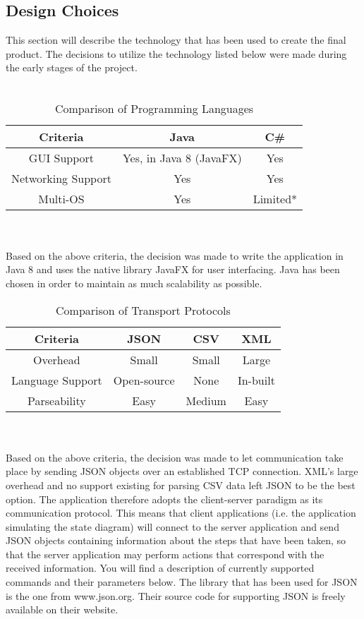 \documentclass[11pt,a4paper,twocolumn]{article}
\begin{document}
\subsection{Design Choices}
This section will describe the technology that has been used to create the final product. The decisions to utilize the technology listed below were made during the early stages of the project.\\\\
\begin{table}[h]
	\begin{center}
		\begin{tabular}{| c || c | c |}
			\hline
			Criteria & Java & C\# \\ \hline
			GUI Support & Yes, in Java 8 (JavaFX) & Yes \\ \hline
			Networking Support & Yes & Yes \\ \hline
			Multi-OS & Yes & Limited* \\ \hline
		\end{tabular}
		\caption{Comparison of Programming Languages}
	\end{center}
\end{table}\\\\
Based on the above criteria, the decision was made to write the application in Java 8 and uses the native library JavaFX for user interfacing. Java has been chosen in order to maintain as much scalability as possible.
\begin{table}[h]
	\begin{center}
		\begin{tabular}{| c || c | c | c |}
			\hline
			Criteria & JSON & CSV & XML \\ \hline
			Overhead & Small & Small & Large \\ \hline
			Language Support & Open-source & None & In-built \\ \hline
			Parseability & Easy & Medium & Easy \\ \hline
		\end{tabular}
		\caption{Comparison of Transport Protocols}
	\end{center}
\end{table}\\\\
Based on the above criteria, the decision was made to let communication take place by sending JSON objects over an established TCP connection. XML's large overhead and no support existing for parsing CSV data left JSON to be the best option. The application therefore adopts the client-server paradigm as its communication protocol. This means that client applications (i.e. the application simulating the state diagram) will connect to the server application and send JSON objects containing information about the steps that have been taken, so that the server application may perform actions that correspond with the received information. You will find a description of currently supported commands and their parameters below.
The library that has been used for JSON is the one from www.json.org. Their source code for supporting JSON is freely available on their website.
\end{document}
